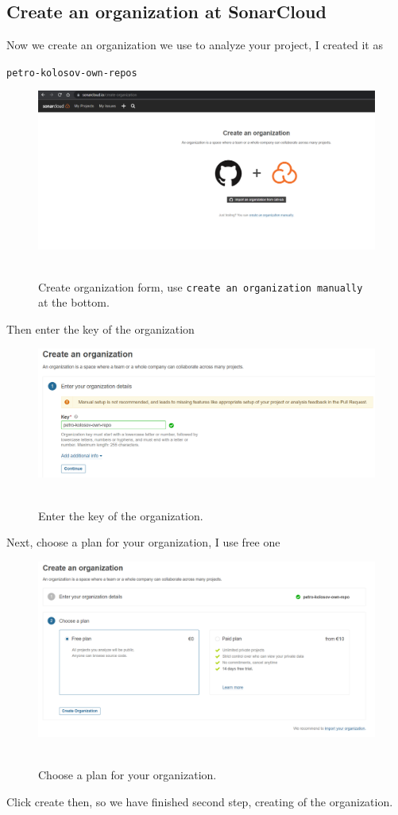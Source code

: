 \subsection{Create an organization at SonarCloud}\label{subsec:create-an-organization-at-sonarcloud}
Now we create an organization we use to analyze your project, I created it as
\begin{center}
    \texttt{petro-kolosov-own-repos}
\end{center}
\begin{figure}[H]
    \centering
    \includegraphics[width=1\textwidth]{img/02_create_organization}
    ~\caption{Create organization form, use \texttt{create an organization manually} at the bottom.}\label{fig:figure2}
\end{figure}
Then enter the key of the organization
\begin{figure}[H]
    \centering
    \includegraphics[width=1\textwidth]{img/03_create_organization_key}
    ~\caption{Enter the key of the organization.}\label{fig:figure3}
\end{figure}
Next, choose a plan for your organization, I use free one
\begin{figure}[H]
    \centering
    \includegraphics[width=1\textwidth]{img/04_choose_org_plan_free}
    ~\caption{Choose a plan for your organization.}\label{fig:figure4}
\end{figure}
Click create then, so we have finished second step, creating of the organization.

